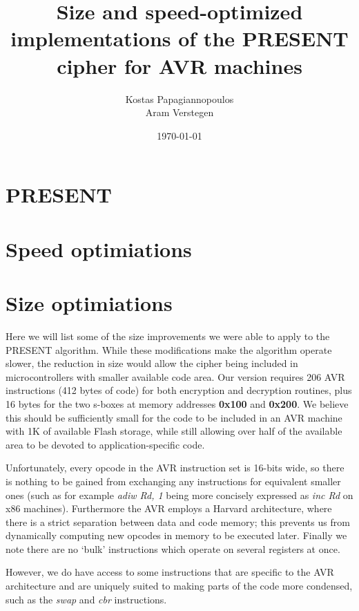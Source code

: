 \documentclass{article}
\begin{document}
\title{Size and speed-optimized implementations of the PRESENT cipher for AVR machines}
\author{
Kostas Papagiannopoulos \\
Aram Verstegen
}
\date{\today}

\maketitle

\abstract{}

\section{PRESENT}
\section{Speed optimiations}
\section{Size optimiations}

Here we will list some of the size improvements we were able to apply to the PRESENT algorithm.
While these modifications make the algorithm operate slower, the reduction in size would allow the cipher being included in microcontrollers with smaller available code area.
Our version requires 206 AVR instructions (412 bytes of code) for both encryption and decryption routines, plus 16 bytes for the two s-boxes at memory addresses \textbf{0x100} and \textbf{0x200}.
We believe this should be sufficiently small for the code to be included in an AVR machine with 1K of available Flash storage, while still allowing over half of the available area to be devoted to application-specific code.

Unfortunately, every opcode in the AVR instruction set is 16-bits wide, so there is nothing to be gained from exchanging any instructions for equivalent smaller ones (such as for example \textit{adiw Rd, 1} being more concisely expressed as \textit{inc Rd} on x86 machines).
Furthermore the AVR employs a Harvard architecture, where there is a strict separation between data and code memory; this prevents us from dynamically computing new opcodes in memory to be executed later.
Finally we note there are no `bulk' instructions which operate on several registers at once.

However, we do have access to some instructions that are specific to the AVR architecture and are uniquely suited to making parts of the code more condensed, such as the \textit{swap} and \textit{cbr} instructions.
\end{document}
